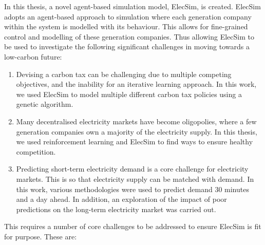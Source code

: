 \documentclass[11pt]{report}
\begin{document}
In this thesis, a novel agent-based simulation model, ElecSim, is created. ElecSim adopts an agent-based approach to simulation where each generation company within the system is modelled with its behaviour. This allows for fine-grained control and modelling of these generation companies. Thus allowing ElecSim to be used to investigate the following significant challenges in moving towards a low-carbon future:
\begin{enumerate}
	\item Devising a carbon tax can be challenging due to multiple competing objectives, and the inability for an iterative learning approach. In this work, we used ElecSim to model multiple different carbon tax policies using a genetic algorithm.
	\item Many decentralised electricity markets have become oligopolies, where a few generation companies own a majority of the electricity supply. In this thesis, we used reinforcement learning and ElecSim to find ways to ensure healthy competition.
	\item Predicting short-term electricity demand is a core challenge for electricity markets. This is so that electricity supply can be matched with demand. In this work, various methodologies were used to predict demand 30 minutes and a day ahead. In addition, an exploration of the impact of poor predictions on the long-term electricity market was carried out.
\end{enumerate}


This requires a number of core challenges to be addressed to ensure ElecSim is fit for purpose. These are:
\end{document}
